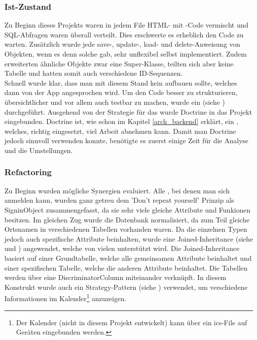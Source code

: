 \subsubsection{Ist-Zustand}
Zu Beginn dieses Projekts waren in jedem File HTML- mit -Code vermischt und SQL-Abfragen waren überall verteilt. Dies erschwerte es erheblich den Code zu warten. Zusätzlich wurde jede save-, update-, load- und delete-Anweisung von Objekten, wenn es denn solche gab, sehr unflexibel selbst implementiert. Zudem erweiterten ähnliche Objekte zwar eine Super-Klasse, teilten sich aber keine Tabelle und hatten somit auch verschiedene ID-Sequenzen.\\

Schnell wurde klar, dass man mit diesem Stand kein  aufbauen sollte, welches dann von der App angesprochen wird. Um den Code besser zu strukturieren, übersichtlicher und vor allem auch testbar zu machen, wurde ein  (siehe \cite{feathers2004working}) durchgeführt. Ausgehend von der Strategie für das  wurde Doctrine in das Projekt eingebunden. Doctrine ist, wie schon im Kapitel \ref{arch_backend} erklärt, ein , welches, richtig eingesetzt, viel Arbeit abnehmen kann. Damit man Doctrine jedoch sinnvoll verwenden konnte, benötigte es zuerst einige Zeit für die Analyse und die Umstellungen.

\subsubsection{Refactoring}
Zu Beginn wurden mögliche Synergien evaluiert. Alle , bei denen man sich anmelden kann, wurden ganz getreu dem 'Don’t repeat yourself' Prinzip als SigninObject zusammengefasst, da sie sehr viele gleiche Attribute und Funkionen besitzen. Im gleichen Zug wurde die Datenbank normalisiert, da zum Teil gleiche Ortsnamen in verschiedenen Tabellen vorhanden waren. Da die einzelnen Typen jedoch auch spezifische Attribute beinhalten, wurde eine Joined-Inheritance (siehe \cite{inheritance_java} und \cite{inheritance_doctrine}) angewendet, welche von vielen  unterstützt wird. Die Joined-Inheritance basiert auf einer Grundtabelle, welche alle gemeinsamen Attribute beinhaltet und einer spezifischen Tabelle, welche die anderen Attribute beinhaltet. Die Tabellen werden über eine DiscriminatorColumn miteinander verknüpft. In diesem Konstrukt wurde auch ein Strategy-Pattern (siehe \cite{gof_book}) verwendet, um verschiedene Informationen im Kalender\footnote{Der Kalender (nicht in diesem Projekt entwickelt) kann über ein ics-File auf Geräten eingebunden werden.} anzuzeigen.\\

